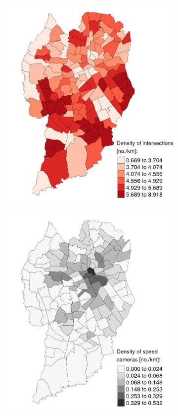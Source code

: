 \begin{figure}[!htbp]
    \centering\footnotesize
    \captionsetup{font=footnotesize}
    \caption{DIS AND DSC}
    \begin{subfigure}{0.5\textwidth}
        \includegraphics{fig/map_DIS.png}
    \end{subfigure}%
    \begin{subfigure}{0.5\textwidth}
        \includegraphics{fig/map_DSC.png}

\end{subfigure}
\end{figure}
